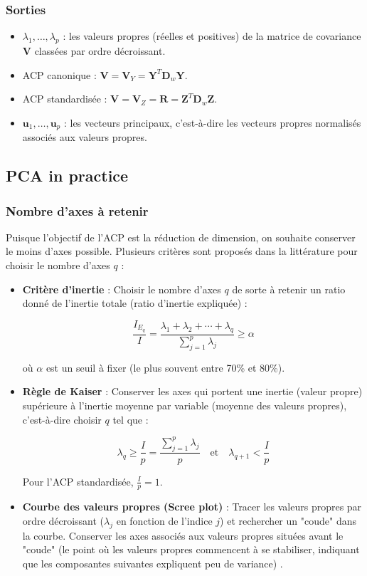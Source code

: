 \documentclass[10pt,a4paper]{article}
\begin{document}
\subsubsection*{Sorties}
\begin{itemize}
    \item $\lambda_1, \ldots, \lambda_p$ : les valeurs propres (réelles et positives) de la matrice de covariance $\mathbf{V}$ classées par ordre décroissant.
    \item ACP canonique : $\mathbf{V} = \mathbf{V}_Y = \mathbf{Y}^T \mathbf{D}_w \mathbf{Y}$.
    \item ACP standardisée : $\mathbf{V} = \mathbf{V}_Z = \mathbf{R} = \mathbf{Z}^T \mathbf{D}_w \mathbf{Z}$.
    \item $\mathbf{u}_1, \ldots, \mathbf{u}_p$ : les vecteurs principaux, c'est-à-dire les vecteurs propres normalisés associés aux valeurs propres.
\end{itemize}

\subsection*{PCA in practice}
\subsubsection*{Nombre d'axes à retenir}
Puisque l'objectif de l'ACP est la réduction de dimension, on souhaite conserver le moins d'axes possible. Plusieurs critères sont proposés dans la littérature pour choisir le nombre d'axes $q$ :
\begin{itemize}
    \item \textbf{Critère d'inertie} : Choisir le nombre d'axes $q$ de sorte à retenir un ratio donné de l'inertie totale (ratio d'inertie expliquée) :

\[
\frac{I_{E_q}}{I} = \frac{\lambda_1 + \lambda_2 + \cdots + \lambda_q}{\sum_{j=1}^p \lambda_j} \geq \alpha
\]

où $\alpha$ est un seuil à fixer (le plus souvent entre 70\% et 80\%).

    \item \textbf{Règle de Kaiser} : Conserver les axes qui portent une inertie (valeur propre) supérieure à l'inertie moyenne par variable (moyenne des valeurs propres), c'est-à-dire choisir $q$ tel que :

\[
\lambda_q \geq \frac{I}{p} = \frac{\sum_{j=1}^p \lambda_j}{p} \quad \text{et} \quad \lambda_{q+1} < \frac{I}{p}
\]

Pour l'ACP standardisée, $\frac{I}{p} = 1$.

    \item \textbf{Courbe des valeurs propres (Scree plot)} : Tracer les valeurs propres par ordre décroissant ($\lambda_j$ en fonction de l'indice $j$) et rechercher un "coude" dans la courbe. Conserver les axes associés aux valeurs propres situées avant le "coude" (le point où les valeurs propres commencent à se stabiliser, indiquant que les composantes suivantes expliquent peu de variance) \cite{builtin_pca}.
\end{itemize}
\end{document}

